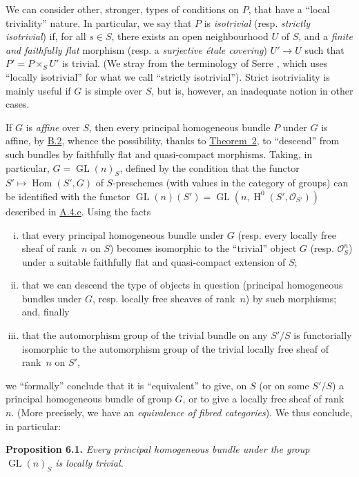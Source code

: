 \documentclass{article}
\newenvironment{itenv}[1]
  {\phantomsection\par\medskip\noindent\textbf{#1.}\itshape}
  {\medskip}
\newcommand{\scr}[1]{{\mathscr{#1}}}
\DeclareMathOperator{\Hom}{Hom}
\DeclareMathOperator{\HH}{H}
\DeclareMathOperator{\GL}{GL}
\newcommand{\oldpage}[1]{\marginpar{\footnotesize$\Big\vert$ \textit{p.~#1}}}
\begin{document}
We can consider other, stronger, types of conditions on $P$, that have a ``local triviality'' nature.
In particular, we say that $P$ is \emph{isotrivial} (resp. \emph{strictly isotrivial}) if, for all $s\in S$, there exists an open neighbourhood $U$ of $S$, and a \emph{finite and faithfully flat} morphism (resp. a \emph{surjective \'{e}tale covering}) $U'\to U$ such that $P'=P\times_S U'$ is trivial.
(We stray from the terminology of Serre \cite{1}, which uses ``locally isotrivial'' for what we call ``strictly isotrivial'').
Strict isotriviality is mainly useful if $G$ is simple over $S$, but is, however, an inadequate notion in other cases.

If $G$ is \emph{affine} over $S$, then every principal homogeneous bundle $P$ under $G$ is affine, by \hyperref[B.2]{B.2}, whence the possibility, thanks to \hyperref[theorem:B.1(2)]{Theorem~2}, to ``descend''
\oldpage{190-28}
from such bundles by faithfully flat and quasi-compact morphisms.
Taking, in particular, $G=\GL(n)_S$, defined by the condition that the functor $S'\mapsto\Hom(S',G)$ of $S$-preschemes (with values in the category of groups) can be identified with the functor $\GL(n)(S')=\GL(n,\HH^0(S',\scr{O}_{S'}))$ described in \hyperref[A.4.e]{A.4.e}.
Using the facts
\begin{enumerate}[(i)]
  \item that every principal homogeneous bundle under $G$ (resp. every locally free sheaf of rank~$n$ on $S$) becomes isomorphic to the ``trivial'' object $G$ (resp. $\scr{O}_S^n$) under a suitable faithfully flat and quasi-compact extension of $S$;
  \item that we can descend the type of objects in question (principal homogeneous bundles under $G$, resp. locally free sheaves of rank~$n$) by such morphisms; and, finally
  \item that the automorphism group of the trivial bundle on any $S'/S$ is functorially isomorphic to the automorphism group of the trivial locally free sheaf of rank~$n$ on $S'$,
\end{enumerate}
we ``formally'' conclude that it is ``equivalent'' to give, on $S$ (or on some $S'/S$) a principal homogeneous bundle of group $G$, or to give a locally free sheaf of rank~$n$.
(More precisely, we have an \emph{equivalence of fibred categories}).
We thus conclude, in particular:

\begin{itenv}{Proposition 6.1}
  Every principal homogeneous bundle under the group $\GL(n)_S$ is locally trivial.
\end{itenv}
\end{document}
